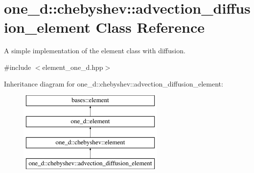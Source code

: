 \hypertarget{classone__d_1_1chebyshev_1_1advection__diffusion__element}{\section{one\-\_\-d\-:\-:chebyshev\-:\-:advection\-\_\-diffusion\-\_\-element Class Reference}
\label{classone__d_1_1chebyshev_1_1advection__diffusion__element}
}


A simple implementation of the element class with diffusion.  




{\ttfamily \#include $<$element\-\_\-one\-\_\-d.\-hpp$>$}

Inheritance diagram for one\-\_\-d\-:\-:chebyshev\-:\-:advection\-\_\-diffusion\-\_\-element\-:\begin{figure}[H]
\begin{center}
\leavevmode
\includegraphics[height=4.000000cm]{classone__d_1_1chebyshev_1_1advection__diffusion__element}
\end{center}
\end{figure}
